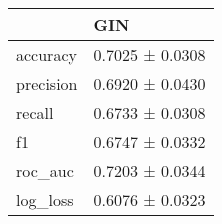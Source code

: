 \begin{tabular}{ll}
\toprule
 & GIN \\
\midrule
accuracy & 0.7025 ± 0.0308 \\
precision & 0.6920 ± 0.0430 \\
recall & 0.6733 ± 0.0308 \\
f1 & 0.6747 ± 0.0332 \\
roc_auc & 0.7203 ± 0.0344 \\
log_loss & 0.6076 ± 0.0323 \\
\bottomrule
\end{tabular}
